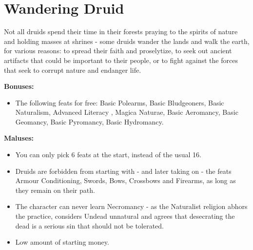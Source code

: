 \section{Wandering Druid}
Not all druids spend their time in their forests praying to the spirits of nature and holding masses at shrines - some druids wander the lands and walk the earth, for various reasons: to spread their faith and proselytize, to seek out ancient artifacts that could be important to their people, or to fight against the forces that seek to corrupt nature and endanger life.


\textbf{Bonuses:}
\begin{itemize}
	\item The following feats for free: Basic Polearms, Basic Bludgeoners, Basic Naturalism, Advanced Literacy , Magica Naturae, Basic Aeromancy, Basic Geomancy, Basic Pyromancy, Basic Hydromancy.
\end{itemize}
\textbf{Maluses:}
\begin{itemize}
	\item You can only pick 6 feats at the start, instead of the usual 16.
	\item Druids are forbidden from starting with - and later taking on - the feats Armour Conditioning, Swords, Bows, Crossbows and Firearms, as long as they remain on their path.
	\item The character can never learn Necromancy - as the Naturalist religion abhors the practice, considers Undead unnatural and agrees that desecrating the dead is a serious sin that should not be tolerated.
	\item Low amount of starting money.
\end{itemize}
